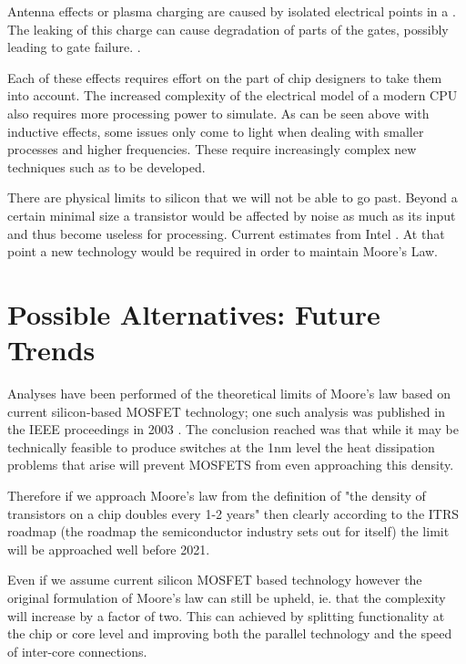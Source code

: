 \documentclass[a4paper,12pt]{article}
\begin{document}
Antenna effects or plasma charging are caused by isolated electrical
points in
a \cite[processor becoming charged during the manufacturing process]{b5}. The
leaking
of this charge can cause degradation of parts of the gates, possibly
leading to
gate failure. \cite[This problem started to arise around 1994 and is not yet
fully
understood]{b6}.

Each of these effects requires effort on the part of chip designers to
take
them into account. The increased complexity of the electrical model of a
modern
CPU also requires more processing power to simulate. As can be seen
above with
inductive effects, some issues only come to light when dealing with
smaller
processes and higher frequencies. These require increasingly complex new
techniques such as \cite[]{b6} to be developed.

There are physical limits to silicon that we will not be able to go
past.
Beyond a certain minimal size a transistor would be affected by noise as
much
as its input and thus become useless for processing. Current estimates
from
Intel \cite[indicate that this is around 20 years away]{b8}. At that point a
new
technology would be required in order to maintain Moore's Law.

\section{Possible Alternatives: Future Trends}

Analyses have been performed of the theoretical limits of Moore's law
based on current silicon-based MOSFET technology; one such analysis was
published in the IEEE proceedings in 2003 \cite[]{e1}. The conclusion reached
was that while it may be technically feasible to produce switches at the
1nm level the heat dissipation problems that arise will prevent MOSFETS
from even approaching this density.

Therefore if we approach Moore's law from the definition of "the density
of transistors on a chip doubles every 1-2 years" then clearly according
to the ITRS roadmap (the roadmap the semiconductor industry sets out for
itself) \cite[]{e2} the limit will be approached well before 2021. 

Even if we assume current silicon MOSFET based technology however the
original formulation of Moore's law can still be upheld, ie. that the
complexity will increase by a factor of two. This can achieved by
splitting functionality at the chip or core level and improving both the
parallel technology and the speed of inter-core connections.
\end{document}
